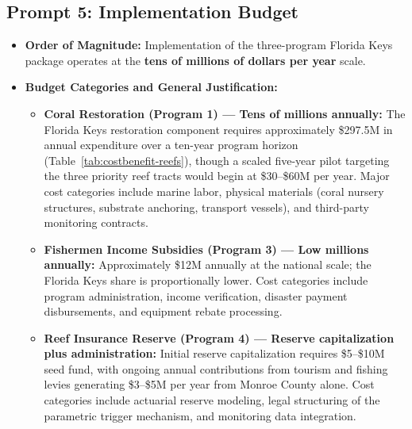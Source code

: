 \documentclass[10pt,letterpaper]{article}
\begin{document}
\subsection*{Prompt 5: Implementation Budget}
\begin{itemize}
    \item \textbf{Order of Magnitude:} Implementation of the three-program Florida Keys package operates at the \textbf{tens of millions of dollars per year} scale.
    \item \textbf{Budget Categories and General Justification:}
    \begin{itemize}
        \item \textbf{Coral Restoration (Program 1) --- Tens of millions annually:} The Florida Keys restoration component requires approximately \$297.5M in annual expenditure over a ten-year program horizon (Table~\ref{tab:costbenefit-reefs}), though a scaled five-year pilot targeting the three priority reef tracts would begin at \$30--\$60M per year. Major cost categories include marine labor, physical materials (coral nursery structures, substrate anchoring, transport vessels), and third-party monitoring contracts.
        \item \textbf{Fishermen Income Subsidies (Program 3) --- Low millions annually:} Approximately \$12M annually at the national scale; the Florida Keys share is proportionally lower. Cost categories include program administration, income verification, disaster payment disbursements, and equipment rebate processing.
        \item \textbf{Reef Insurance Reserve (Program 4) --- Reserve capitalization plus administration:} Initial reserve capitalization requires \$5--\$10M seed fund, with ongoing annual contributions from tourism and fishing levies generating \$3--\$5M per year from Monroe County alone. Cost categories include actuarial reserve modeling, legal structuring of the parametric trigger mechanism, and monitoring data integration.
    \end{itemize}
\end{itemize}
\end{document}
